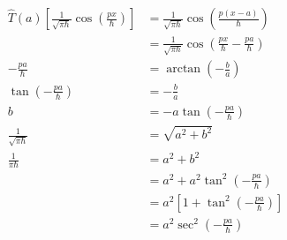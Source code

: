 \documentclass{article}
\begin{document}
\begin{enumerate}
        \begin{align*}
          \hat{T}(a) \left[ \frac{1}{\sqrt{\pi \hbar}} \cos \left( \frac{p x}{\hbar} \right) \right] & = \frac{1}{\sqrt{\pi \hbar}} \cos \left( \frac{p (x - a)}{\hbar} \right)                                         \\
                                                                                                     & = \frac{1}{\sqrt{\pi \hbar}} \cos \left( \frac{p x}{\hbar} - \frac{p a}{\hbar} \right)                           \\
          -\frac{p a}{\hbar}                                                                         & = \arctan \left( -\frac{b}{a} \right)                                                                            \\
          \tan \left( -\frac{p a}{\hbar} \right)                                                     & = -\frac{b}{a}                                                                                                   \\
          b                                                                                          & = -a \tan \left( -\frac{p a}{\hbar} \right)                                                                      \\
          \frac{1}{\sqrt{\pi \hbar}}                                                                 & = \sqrt{a^2 + b^2}                                                                                               \\
          \frac{1}{\pi \hbar}                                                                        & = a^2 + b^2                                                                                                      \\
                                                                                                     & = a^2 + a^2 \tan^2 \left( -\frac{p a}{\hbar} \right)                                                             \\
                                                                                                     & = a^2 \left[ 1 + \tan^2 \left( -\frac{p a}{\hbar} \right) \right]                                                \\
                                                                                                     & = a^2 \sec^2 \left( -\frac{p a}{\hbar} \right)                                                                   \\

\end{align*}
\end{enumerate}
\end{document}
